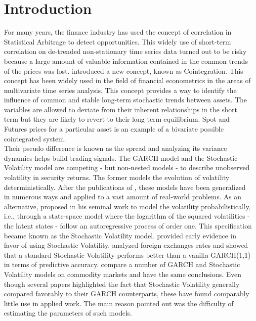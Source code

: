 \documentclass[11pt,a4,twosided,singlespacing,titlepagenumber=on]{scrreprt}
\numberwithin{equation}{chapter} %
\theoremstyle{remark}
\begin{document}
\chapter{Introduction}

For many years, the finance industry has used the concept of correlation in Statistical Arbitrage to detect opportunities. This widely use of short-term correlation on de-trended non-stationary time series data turned out to be risky because a large amount of valuable information contained in the common trends of the prices was lost. \cite{engle1987} introduced a new concept, known as Cointegration. This concept has been widely used in the field of financial econometrics in the areas of multivariate time series analysis. This concept provides a way to identify the influence of common and stable long-term stochastic trends between assets. The variables are allowed to deviate from their inherent relationships in the short term but they are likely to revert to their long term equilibrium. Spot and Futures prices for a particular asset is an example of a bivariate possible cointegrated system. \\

Their pseudo difference is known as the spread and analyzing its variance dynamics helps build trading signals. The GARCH model and the Stochastic Volatility model are competing - but non-nested models - to describe unobserved volatility in security returns. The former models the evolution of volatility deterministically. After the publications of \cite{engle1986}, these models have been generalized in numerous ways and applied to a vast amount of real-world problems. As an alternative, \cite{taylor1982} proposed in his seminal work to model the volatility probabilistically, i.e., through a state-space model where the logarithm of the squared volatilities - the latent states - follow an autoregressive process of order one. This specification became known as the Stochastic Volatility model. \cite{kim1998} provided early evidence in favor of using Stochastic Volatility. \cite{kastner2014} analyzed foreign exchanges rates and showed that a standard Stochastic Volatility performs better than a vanilla GARCH(1,1) in terms of predictive accuracy. \cite{chan2015} compare a number of GARCH and Stochastic Volatility models on commodity markets and have the same conclusions. Even though several papers highlighted the fact that Stochastic Volatility generally compared favorably to their GARCH counterparts, these have found comparably little use in applied work. The main reason pointed out was the difficulty of estimating the parameters of such models. \\
\end{document}

